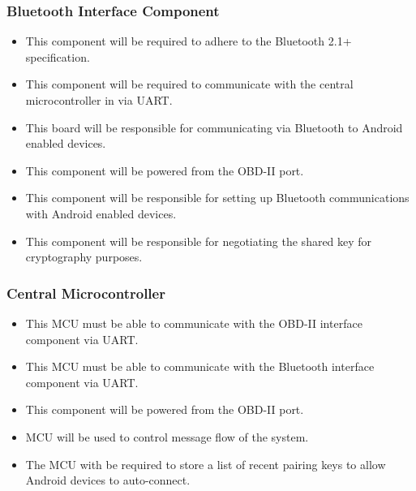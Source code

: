 \documentclass[12pt,letterpaper]{article}
\begin{document}
\subsubsection{Bluetooth Interface Component}
\begin{itemize}
	\item This component will be required to adhere to the Bluetooth 2.1+ specification.
	\item This component will be required to communicate with the central microcontroller in via UART.
	\item This board will be responsible for communicating via Bluetooth to Android enabled devices.
	\item This component will be powered from the OBD-II port.
	\item This component will be responsible for setting up Bluetooth communications with Android enabled devices.
	\item This component will be responsible for negotiating the shared key for cryptography purposes.
\end{itemize}

\subsubsection{Central Microcontroller}
\begin{itemize}
	\item This MCU must be able to communicate with the OBD-II interface component via UART.
	\item This MCU must be able to communicate with the Bluetooth interface component via UART.
	\item This component will be powered from the OBD-II port.
	\item MCU will be used to control message flow of the system.
	\item The MCU with be required to store a list of recent pairing keys to allow Android devices to auto-connect.
\end{itemize} 
\end{document}
